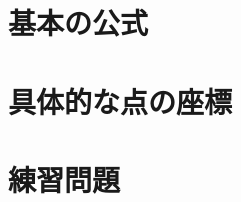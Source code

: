 \documentclass[dvipdfmx]{jsarticle}
\begin{document}
\maketitle
\tableofcontents
\clearpage
\setcounter{section}{1}
\newpage
\section{基本の公式}

%
\newpage
\section{具体的な点の座標}

%
\newpage
\section{練習問題}

\end{document}
